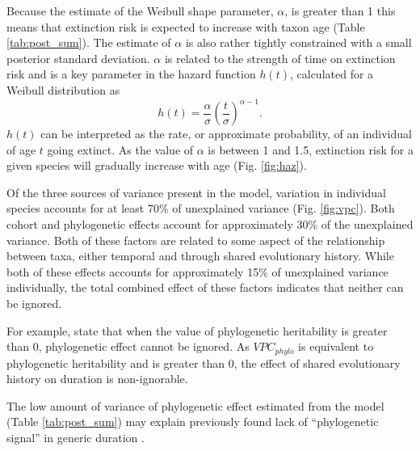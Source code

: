 \documentclass[12pt,letterpaper]{article}
\begin{document}
Because the estimate of the Weibull shape parameter, \(\alpha\), is greater than 1 this means that extinction risk is expected to increase with taxon age (Table \ref{tab:post_sum}). The estimate of \(\alpha\) is also rather tightly constrained with a small posterior standard deviation. \(\alpha\) is related to the strength of time on extinction risk and is a key parameter in the hazard function \(h(t)\), calculated for a Weibull distribution as
\begin{equation}
  h(t) = \frac{\alpha}{\sigma}\left(\frac{t}{\sigma}\right)^{\alpha - 1}.
\end{equation}
\(h(t)\) can be interpreted as the rate, or approximate probability, of an individual of age \(t\) going extinct. As the value of \(\alpha\) is between 1 and 1.5, extinction risk for a given species will gradually increase with age (Fig. \ref{fig:haz}). 

Of the three sources of variance present in the model, variation in individual species accounts for at least 70\% of unexplained variance (Fig. \ref{fig:vpc}). Both cohort and phylogenetic effects account for approximately 30\% of the unexplained variance. Both of these factors are related to some aspect of the relationship between taxa, either temporal and through shared evolutionary history. While both of these effects accounts for approximately 15\% of unexplained variance individually, the total combined effect of these factors indicates that neither can be ignored. 

For example, \citet{Housworth2004} state that when the value of phylogenetic heritability is greater than 0, phylogenetic effect cannot be ignored. As \(VPC_{phylo}\) is equivalent to phylogenetic heritability and is greater than 0, the effect of shared evolutionary history on duration is non-ignorable.

The low amount of variance of phylogenetic effect estimated from the model (Table \ref{tab:post_sum}) may explain previously found lack of ``phylogenetic signal'' in generic duration \citep{Tomiya2013}.



\end{document}
